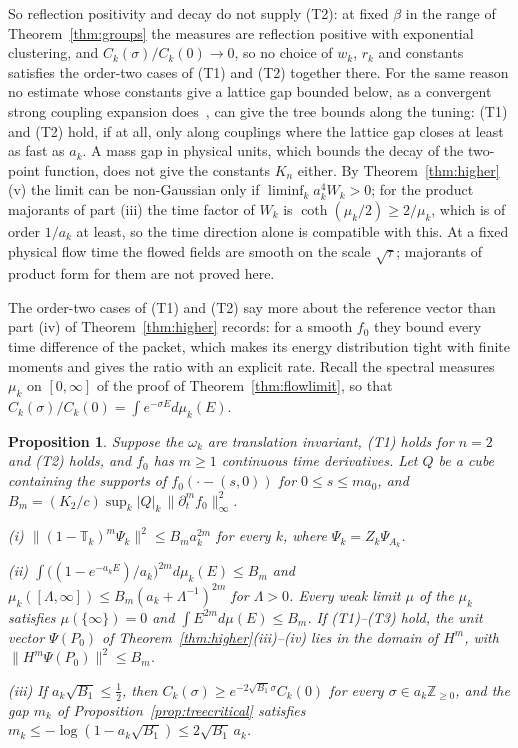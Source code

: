 \documentclass[11pt]{amsart}
\newtheorem{proposition}[theorem]{Proposition}
\theoremstyle{definition}
\theoremstyle{remark}
\numberwithin{equation}{section}
\newcommand{\Z}{\mathbb{Z}}
\begin{document}
So reflection positivity and decay do not supply (T2): at fixed $\beta$
in the range of Theorem~\ref{thm:groups} the measures are reflection
positive with exponential clustering, and $C_k(\sigma)/C_k(0)\to0$, so no
choice of $w_k$, $r_k$ and constants satisfies the order-two cases of (T1)
and (T2) together there. For the same reason no
estimate whose constants give a lattice gap bounded below, as a convergent
strong coupling expansion does~\cite{OSei78}, can give the tree bounds along
the tuning: (T1) and (T2) hold, if at all, only along couplings where the lattice
gap closes at least as fast as $a_k$. A mass gap in physical units,
which bounds the decay of the two-point function, does not give the constants
$K_n$ either. By Theorem~\ref{thm:higher}(v) the limit can be non-Gaussian
only if $\liminf_ka_k^4W_k>0$; for the product majorants of part (iii) the
time factor of $W_k$ is $\coth(\mu_k/2)\ge2/\mu_k$, which is of order $1/a_k$
at least, so the time direction alone is compatible with this. At a fixed
physical flow time the flowed fields are smooth on the scale $\sqrt\tau$;
majorants of product form for them are not proved here.

The order-two cases of (T1) and (T2) say more about the reference vector than
part (iv) of Theorem~\ref{thm:higher} records: for a smooth $f_0$ they bound
every time difference of the packet, which makes its energy distribution tight
with finite moments and gives the ratio with an explicit rate. Recall the
spectral measures $\mu_k$ on $[0,\infty]$ of the proof of
Theorem~\ref{thm:flowlimit}, so that
$C_k(\sigma)/C_k(0)=\int e^{-\sigma E}d\mu_k(E)$.

\begin{proposition}\label{prop:treeenergy}
Suppose the $\omega_k$ are translation invariant, \textup{(T1)} holds for
$n=2$ and \textup{(T2)} holds, and $f_0$ has $m\ge1$ continuous time
derivatives. Let $Q$ be a cube containing the supports of $f_0(\cdot-(s,0))$
for $0\le s\le m a_0$, and
$B_m=(K_2/c)\sup_k|Q|_k\,\|\partial_t^mf_0\|_\infty^2$.

\textup{(i)} $\|(1-\mathbb T_k)^m\Psi_k\|^2\le B_ma_k^{2m}$ for every $k$,
where $\Psi_k=Z_k\Psi_{A_k}$.

\textup{(ii)} $\int\bigl((1-e^{-a_kE})/a_k\bigr)^{2m}d\mu_k(E)\le B_m$ and
$\mu_k([\Lambda,\infty])\le B_m(a_k+\Lambda^{-1})^{2m}$ for $\Lambda>0$. Every
weak limit $\mu$ of the $\mu_k$ satisfies $\mu(\{\infty\})=0$ and
$\int E^{2m}d\mu(E)\le B_m$. If \textup{(T1)--(T3)} hold, the unit vector
$\Psi(P_0)$ of Theorem~\textup{\ref{thm:higher}(iii)--(iv)} lies in the domain
of $H^m$, with $\|H^m\Psi(P_0)\|^2\le B_m$.

\textup{(iii)} If $a_k\sqrt{B_1}\le\frac12$, then
$C_k(\sigma)\ge e^{-2\sqrt{B_1}\sigma}C_k(0)$ for every $\sigma\in a_k\Z_{\ge0}$,
and the gap $m_k$ of Proposition~\textup{\ref{prop:treecritical}} satisfies
$m_k\le-\log(1-a_k\sqrt{B_1})\le2\sqrt{B_1}\,a_k$.
\end{proposition}
\end{document}
